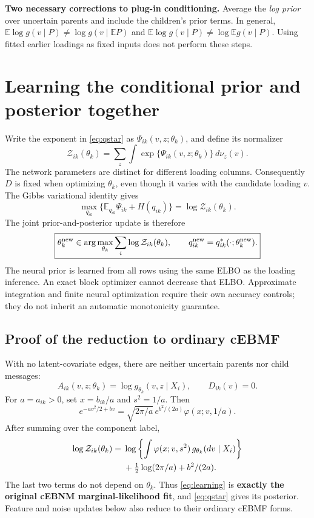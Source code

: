 \documentclass[11pt,a4paper]{article}
\newcommand{\E}{\mathbb E}
\newcommand{\Normal}[3]{\varphi(#1;#2,#3)}
\newcommand{\note}[1]{\par\smallskip\noindent\colorbox{blue!5}{\parbox{\dimexpr\linewidth-2\fboxsep\relax}{#1}}\par\smallskip}
\begin{document}
\note{\textbf{Two necessary corrections to plug-in conditioning.}
Average the \emph{log prior} over uncertain parents and include the
children's prior terms. In general,
\(\E\log g(v\mid P)\ne\log g(v\mid\E P)\) and
\(\E\log g(v\mid P)\ne\log\E g(v\mid P)\).
Using fitted earlier loadings as fixed inputs does not perform these steps.}

\clearpage
\section{Learning the conditional prior and posterior together}
Write the exponent in \eqref{eq:qstar} as
\(\Psi_{ik}(v,z;\theta_k)\), and define its normalizer
\begin{equation}
\mathcal Z_{ik}(\theta_k)=\sum_z\int
\exp\{\Psi_{ik}(v,z;\theta_k)\}\,d\nu_z(v).
\label{eq:normalizer}
\end{equation}
The network parameters are distinct for different loading columns.
Consequently \(D\) is fixed when optimizing \(\theta_k\), even though it varies
with the candidate loading \(v\). The Gibbs variational identity gives
\begin{equation}
\max_{q_{ik}}\{\E_{q_{ik}}\Psi_{ik}+H(q_{ik})\}
=\log\mathcal Z_{ik}(\theta_k).
\label{eq:profile}
\end{equation}
The joint prior-and-posterior update is therefore
\begin{equation}
\boxed{\theta_k^{\rm new}\in\arg\max_{\theta_k}\sum_i\log\mathcal Z_{ik}(\theta_k),
\qquad q_{ik}^{\rm new}=q^*_{ik}(\cdot;\theta_k^{\rm new}).}
\label{eq:learning}
\end{equation}
The neural prior is learned from all rows using the same ELBO as the
loading inference. An exact block optimizer cannot decrease that ELBO.
Approximate integration and finite neural optimization require their own
accuracy controls; they do not inherit an automatic monotonicity guarantee.

\subsection{Proof of the reduction to ordinary cEBMF}
With no latent-covariate edges, there are neither uncertain parents nor
child messages:
\[
A_{ik}(v,z;\theta_k)=\log g_{\theta_k}(v,z\mid X_i),\qquad D_{ik}(v)=0.
\]
For \(a=a_{ik}>0\), set \(x=b_{ik}/a\) and \(s^2=1/a\). Then
\[
e^{-av^2/2+bv}=\sqrt{2\pi/a}\,e^{b^2/(2a)}\Normal{x}{v}{1/a}.
\]
After summing over the component label,
\begin{align}
\log\mathcal Z_{ik}(\theta_k)
={}&\log\left\{\int\Normal{x}{v}{s^2}\,
g_{\theta_k}(dv\mid X_i)\right\}\notag\\
 &+\tfrac12\log(2\pi/a)+b^2/(2a).
\label{eq:reduction}
\end{align}
The last two terms do not depend on \(\theta_k\). Thus \eqref{eq:learning} is
\textbf{exactly the original cEBNM marginal-likelihood fit}, and
\eqref{eq:qstar} gives its posterior. Feature and noise updates below also
reduce to their ordinary cEBMF forms.
\end{document}
